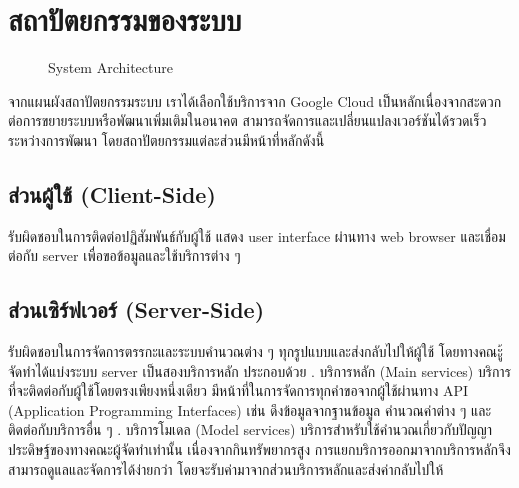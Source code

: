 \section{สถาปัตยกรรมของระบบ}
\begin{figure}[H]\centering
    \setlength{\fboxrule}{0.2mm} %
    \setlength{\fboxsep}{0.5cm}
    \caption{System Architecture}\label{fig:system_architecture}
\end{figure}
จากแผนผังสถาปัตยกรรมระบบ เราได้เลือกใช้บริการจาก Google Cloud เป็นหลักเนื่องจากสะดวกต่อการขยายระบบหรือพัฒนาเพิ่มเติมในอนาคต 
สามารถจัดการและเปลี่ยนแปลงเวอร์ชันได้รวดเร็วระหว่างการพัฒนา โดยสถาปัตยกรรมแต่ละส่วนมีหน้าที่หลักดังนี้

\subsection{ส่วนผู้ใช้ (Client-Side)}
รับผิดชอบในการติดต่อปฏิสัมพันธ์กับผู้ใช้ แสดง user interface ผ่านทาง web browser และเชื่อมต่อกับ server เพื่อขอข้อมูลและใช้บริการต่าง ๆ

\subsection{ส่วนเซิร์ฟเวอร์ (Server-Side)}
รับผิดชอบในการจัดการตรรกะและระบบคำนวณต่าง ๆ ทุกรูปแบบและส่งกลับไปให้ผู้ใช้ โดยทางคณะู้จัดทำได้แบ่งระบบ server เป็นสองบริการหลัก ประกอบด้วย
. บริการหลัก (Main services)
\newline
บริการที่จะติดต่อกับผู้ใช้โดยตรงเพียงหนึ่งเดียว มีหน้าที่ในการจัดการทุกคำขอจากผู้ใช้ผ่านทาง API (Application Programming Interfaces) เช่น ดึงข้อมูลจากฐานข้อมูล คำนวณค่าต่าง ๆ และติดต่อกับบริการอื่น ๆ
. บริการโมเดล (Model services)
\newline
บริการสำหรับใช้คำนวณเกี่ยวกับปัญญาประดิษฐ์ของทางคณะผู้จัดทำเท่านั้น เนื่องจากกินทรัพยากรสูง การแยกบริการออกมาจากบริการหลักจึงสามารถดูแลและจัดการได้ง่ายกว่า โดยจะรับค่ามาจากส่วนบริการหลักและส่งค่ากลับไปให้


